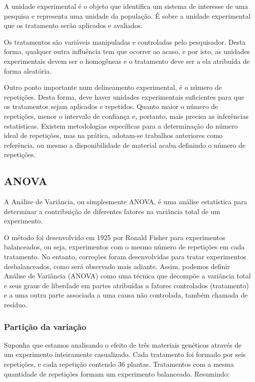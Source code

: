 \documentclass[
]{article}
\begin{document}
A unidade experimental é o objeto que identifica um sistema de interesse de uma pesquisa e representa uma unidade da população. É sobre a unidade experimental que os tratamento serão aplicados e avaliados.

Os tratamentos são variáveis manipuladas e controladas pelo pesquisador. Desta forma, qualquer outra influência tem que ocorrer ao acaso, e por isto, as unidades experimentais devem ser o homogêneas e o tratamento deve ser a ela atribuída de forma aleatória.

Outro ponto importante num delineamento experimental, é o número de repetições. Desta forma, deve haver unidades experimentais suficientes para que os tratamentos sejam aplicados e repetidos. Quanto maior o número de repetições, menor o intervalo de confiança e, portanto, mais precisa as inferências estatísticas. Existem metodologias específicas para a determinação do número ideal de repetições, mas na prática, adotam-se trabalhos anteriores como referência, ou mesmo a disponibilidade de material acaba definindo o número de repetições.

\hypertarget{anova}{%
\subsection{ANOVA}\label{anova}}

A Análise de Variância, ou simplesmente ANOVA, é uma análise estatística para determinar a contribuição de diferentes fatores na variância total de um experimento.

O método foi desenvolvido em 1925 por Ronald Fisher para experimentos balanceados, ou seja, experimentos com o mesmo número de repetições em cada tratamento. No entanto, correções foram desenvolvidas para tratar experimentos desbalanceados, como será observado mais adiante. Assim, podemos definir Análise de Variância (ANOVA) como uma técnica que decompõe a variância total e seus graus de liberdade em partes atribuídas a fatores controlados (tratamento) e a uma outra parte associada a uma causa não controlada, também chamada de resíduo.

\hypertarget{partiuxe7uxe3o-da-variauxe7uxe3o}{%
\subsubsection{Partição da variação}\label{partiuxe7uxe3o-da-variauxe7uxe3o}}

Suponha que estamos analisando o efeito de três materiais genéticos através de um experimento inteiramente casualizado. Cada tratamento foi formado por seis repetições, e cada repetição contendo 36 plantas. Tratamentos com a mesma quantidade de repetições formam um experimento balanceado. Resumindo:
\end{document}
